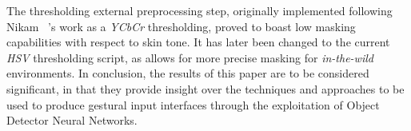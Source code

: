 \documentclass[10pt,twocolumn,letterpaper]{article}
\begin{document}
\begin{flushleft}
The thresholding external preprocessing step, originally implemented following Nikam \etal~\cite{7916786}'s work as a \textit{YCbCr} thresholding, proved to boast low masking capabilities with respect to skin tone. It has later been changed to the current \textit{HSV} thresholding script, as allows for more precise masking for \textit{in-the-wild} environments.\linebreak
In conclusion, the results of this paper are to be considered significant, in that they provide insight over the techniques and approaches to be used to produce gestural input interfaces through the exploitation of Object Detector Neural Networks.\linebreak
\end{flushleft}

\pagebreak
{\small


}
\end{document}
